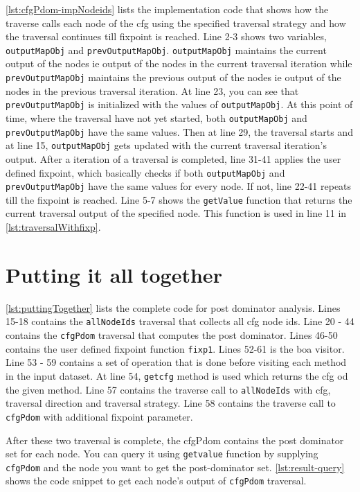 

\ref{lst:cfgPdom-impNodeids} lists the implementation code that shows how the traverse calls each node of the cfg using the specified traversal strategy and how the traversal continues till fixpoint is reached. Line 2-3 shows two variables, \lstinline|outputMapObj| and \lstinline|prevOutputMapObj|. \lstinline|outputMapObj| maintains the current output of the nodes ie output of the nodes in the current traversal iteration while \lstinline|prevOutputMapObj| maintains the previous output of the nodes ie output of the nodes in the previous traversal iteration.
At line 23, you can see that \lstinline|prevOutputMapObj| is initialized with the values of \lstinline|outputMapObj|. At this point of time, where the traversal have not yet started, both \lstinline|outputMapObj| and \lstinline|prevOutputMapObj| have the same values. Then at line 29, the traversal starts and at line 15, \lstinline|outputMapObj| gets updated with the current traversal iteration's output. After a iteration of a traversal is completed, line 31-41 applies the user defined fixpoint, which basically checks if both \lstinline|outputMapObj| and \lstinline|prevOutputMapObj| have the same values for every node. If not, line 22-41 repeats till the fixpoint is reached. Line 5-7 shows the \lstinline|getValue| function that returns the current traversal output of the specified node. This function is used in line 11 in \ref{lst:traversalWithfixp}.

\section{Putting it all together}

\ref{lst:puttingTogether} lists the complete code for post dominator analysis. Lines 15-18 contains the \lstinline|allNodeIds| traversal that collects all cfg node ids. Line 20 - 44 contains the \lstinline|cfgPdom| traversal that computes the post dominator. Lines 46-50 contains the user defined fixpoint function \lstinline|fixp1|. Lines 52-61 is the boa visitor. Line 53 - 59 contains a set of operation that is done before visiting each method in the input dataset. At line 54, \lstinline|getcfg| method is used which returns the cfg od the given method. Line 57 contains the traverse call to \lstinline|allNodeIds| with cfg, traversal direction and traversal strategy. Line 58 contains the traverse call to \lstinline|cfgPdom| with additional fixpoint parameter. 


After these two traversal is complete, the cfgPdom contains the post dominator set for each node. You can query it using \lstinline|getvalue| function by supplying \lstinline|cfgPdom| and the node you want to get the post-dominator set. \ref{lst:result-query} shows the code snippet to get each node's output of \lstinline|cfgPdom| traversal. 